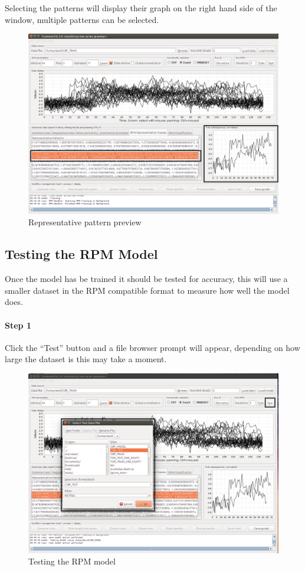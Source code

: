 \documentclass[letterpaper, 12pt]{article}
\begin{document}
\newpage
Selecting the patterns will display their graph on the right hand side of the window, multiple patterns can be selected.

\begin{figure}[H]
  \includegraphics[width=\textwidth]{grammarviz-training-step-6}
  \caption{Representative pattern preview}
  \label{fig:grammarviz-training-step-6}
\end{figure}

\newpage
\subsection{Testing the RPM Model}
Once the model has be trained it should be tested for accuracy, this will use a smaller dataset in the RPM compatible format to measure how well the model does. 

\paragraph{Step 1}
Click the ``Test'' button and a file browser prompt will appear, depending on how large the dataset is this may take a moment. 

\begin{figure}[H]
  \includegraphics[width=\textwidth]{grammarviz-testing-step-1}
  \caption{Testing the RPM model}
  \label{fig:grammarviz-testing-step-1}
\end{figure}
\end{document}
